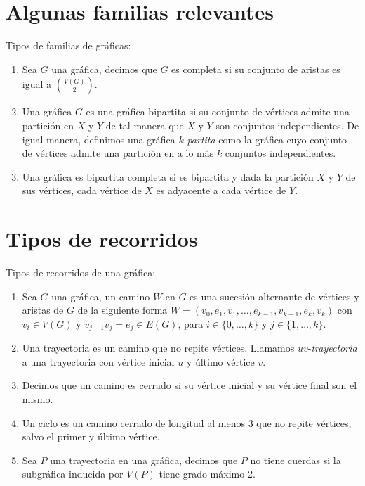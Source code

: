 \section{Algunas familias relevantes}
\label{sec:famGraf}
\begin{definicion} Tipos de familias de gr\'aficas:
    \label{def:familias}
    \begin{enumerate}
        \item Sea $G$ una gr\'afica, decimos que $G$ es completa si su
        conjunto de aristas es igual a $\binom{V(G)}{2}$.
        \item Una gr\'afica $G$ es una gr\'afica bipartita si su conjunto de
        v\'ertices admite una partici\'on en $X$ y $Y$ de tal manera que $X$ y
        $Y$ son conjuntos independientes. De igual manera, definimos una
        gr\'afica $k$-\textit{partita} como la gr\'afica cuyo conjunto de
        v\'ertices admite una partici\'on en a lo m\'as $k$ conjuntos
        independientes.
        \item Una gr\'afica es bipartita completa si es bipartita y dada la
        partici\'on $X$ y $Y$ de sus v\'ertices, cada v\'ertice de $X$ es
        adyacente a cada v\'ertice de $Y$.   
    \end{enumerate}
\end{definicion}

\section{Tipos de recorridos}
\label{sec:recorridos}


\begin{definicion} Tipos de recorridos de una gr\'afica:
    \label{def:tipos de recorridos}
    \begin{enumerate}
        \item Sea $G$ una gr\'afica, un camino $W$ en $G$ es una sucesi\'on
        alternante de v\'ertices y aristas de $G$ de la siguiente forma $W=(v_0,
        e_1,v_1, \dots, e_{k-1},v_{k-1}, e_k,v_k)$ con $v_i \in V(G)$ y
        $v_{j-1}v_j = e_j \in E(G)$, para $i \in \{0, \dots, k\}$ y $j \in \{ 1,
        \dots, k\}$.
        \item Una trayectoria es un camino que no repite v\'ertices. Llamamos
        $uv$-\textit{trayectoria} a una trayectoria con v\'ertice inicial $u$ y
        \'ultimo v\'ertice $v$.
        \item Decimos que un camino es cerrado si su v\'ertice inicial y su
        v\'ertice final son el mismo.
        \item Un ciclo es un camino cerrado de longitud al menos $3$ que no
        repite v\'ertices, salvo el primer y \'ultimo v\'ertice.
        \item Sea $P$ una trayectoria en una gr\'afica, decimos que $P$ no tiene
        cuerdas si la subgr\'afica inducida por $V(P)$ tiene grado m\'aximo 2.
    \end{enumerate}
\end{definicion}

